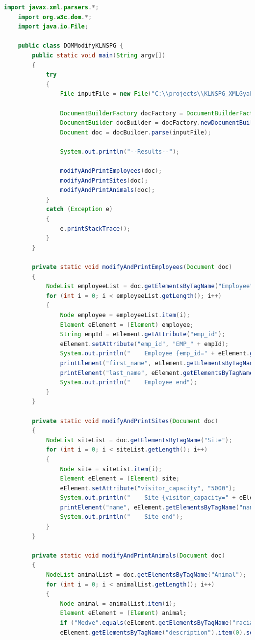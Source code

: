 \documentclass[12pt]{report}
\begin{document}
\begin{lstlisting}[caption={DOMQModifyKLNSPG.java} olvasó program, language=Java]
	import javax.xml.parsers.*;
	import org.w3c.dom.*;
	import java.io.File;
	
	public class DOMModifyKLNSPG {
		public static void main(String argv[])
		{
			try
			{
				File inputFile = new File("C:\\projects\\KLNSPG_XMLGyak\\XMLTaskKLNSPG\\XMLKLNSPG.xml");
				
				DocumentBuilderFactory docFactory = DocumentBuilderFactory.newInstance();
				DocumentBuilder docBuilder = docFactory.newDocumentBuilder();
				Document doc = docBuilder.parse(inputFile);
				
				System.out.println("--Results--");
				
				modifyAndPrintEmployees(doc);
				modifyAndPrintSites(doc);
				modifyAndPrintAnimals(doc);
			} 
			catch (Exception e)
			{
				e.printStackTrace();
			}
		}
		
		private static void modifyAndPrintEmployees(Document doc)
		{
			NodeList employeeList = doc.getElementsByTagName("Employee");
			for (int i = 0; i < employeeList.getLength(); i++)
			{
				Node employee = employeeList.item(i);
				Element eElement = (Element) employee;
				String empId = eElement.getAttribute("emp_id");
				eElement.setAttribute("emp_id", "EMP_" + empId);
				System.out.println("    Employee {emp_id=" + eElement.getAttribute("emp_id") + "} start");
				printElement("first_name", eElement.getElementsByTagName("first_name").item(0).getTextContent());
				printElement("last_name", eElement.getElementsByTagName("last_name").item(0).getTextContent());
				System.out.println("    Employee end");
			}
		}
		
		private static void modifyAndPrintSites(Document doc)
		{
			NodeList siteList = doc.getElementsByTagName("Site");
			for (int i = 0; i < siteList.getLength(); i++)
			{
				Node site = siteList.item(i);
				Element eElement = (Element) site;
				eElement.setAttribute("visitor_capacity", "5000");
				System.out.println("    Site {visitor_capacity=" + eElement.getAttribute("visitor_capacity") + "} start");
				printElement("name", eElement.getElementsByTagName("name").item(0).getTextContent());
				System.out.println("    Site end");
			}
		}
		
		private static void modifyAndPrintAnimals(Document doc)
		{
			NodeList animalList = doc.getElementsByTagName("Animal");
			for (int i = 0; i < animalList.getLength(); i++)
			{
				Node animal = animalList.item(i);
				Element eElement = (Element) animal;
				if ("Medve".equals(eElement.getElementsByTagName("racial").item(0).getTextContent()))
				eElement.getElementsByTagName("description").item(0).setTextContent("A medve eros es bator");
				

\end{lstlisting}
\end{document}
